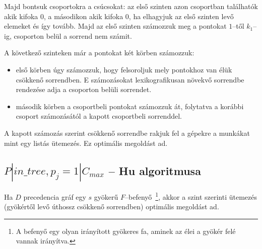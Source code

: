 Majd bontsuk csoportokra a csúcsokat: az első szinten azon csoportban találhatók
akik kifoka $0$, a másodikon akik kifoka $0$, ha elhagyjuk az első szinten levő
elemeket és így tovább. Majd az első szinten számozzuk meg a pontokat $1$--től
$k_1$--ig, csoporton belül a sorrend nem számit.

A következő szinteken már a pontokat két körben számozzuk:
\begin{itemize}
  \item első körben úgy számozzuk, hogy felsoroljuk mely pontokhoz van élük
  csökkenő sorrendben. E számozásokat lexikografikusan növekvő sorrendbe
  rendezése adja a csoporton belüli sorrendet.
  \item második körben a csoportbeli pontokat számozzuk át, folytatva a korábbi
  csoport számozásától a kapott csoportbeli sorrenddel.
\end{itemize}
 
A kapott számozás szerint csökkenő sorrendbe rakjuk fel a gépekre a munkákat mint
egy listás ütemezés. Ez optimális megoldást ad. 


\subsection{ \texorpdfstring {$ P|in\_tree, p_j=1|C_{max} $} {P|in-tree,pj=1|Cmax} -- Hu algoritmusa}

Ha $D$ precedencia gráf egy $s$ gyökerű $F$--befenyő~\footnote{A befenyő egy
olyan irányított gyökeres fa, aminek az élei a gyökér felé vannak irányítva.},
akkor a szint szerinti ütemezés (gyökértől levő úthossz csökkenő sorrendben)
optimális megoldást ad.